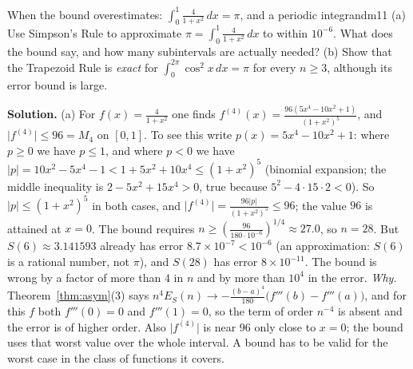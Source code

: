\documentclass[11pt]{article}
\begin{document}
\begin{exmp}{When the bound overestimates: $\int_0^1\frac4{1+x^2}\,dx=\pi$, and a periodic integrand}{m11}
(a) Use Simpson's Rule to approximate $\pi=\int_0^1\frac4{1+x^2}\,dx$ to within $10^{-6}$. What does the bound say, and how many subintervals are actually needed? (b) Show that the Trapezoid Rule is \emph{exact} for $\int_0^{2\pi}\cos^2x\,dx=\pi$ for every $n\ge3$, although its error bound is large.

\textbf{Solution.} (a) For $f(x)=\frac4{1+x^2}$ one finds $f^{(4)}(x)=\frac{96\left(5x^4-10x^2+1\right)}{(1+x^2)^5}$, and $\lvert f^{(4)}\rvert\le96=M_4$ on $[0,1]$. To see this write $p(x)=5x^4-10x^2+1$: where $p\ge0$ we have $p\le1$, and where $p<0$ we have $\lvert p\rvert=10x^2-5x^4-1<1+5x^2+10x^4\le(1+x^2)^5$ (binomial expansion; the middle inequality is $2-5x^2+15x^4>0$, true because $5^2-4\cdot15\cdot2<0$). So $\lvert p\rvert\le(1+x^2)^5$ in both cases, and $\lvert f^{(4)}\rvert=\frac{96\lvert p\rvert}{(1+x^2)^5}\le96$; the value $96$ is attained at $x=0$. The bound requires $n\ge\left(\frac{96}{180\cdot10^{-6}}\right)^{1/4}\approx27.0$, so $n=28$. But $S(6)\approx3.141593$ already has error $8.7\times10^{-7}<10^{-6}$ (an approximation: $S(6)$ is a rational number, not $\pi$), and $S(28)$ has error $8\times10^{-11}$. The bound is wrong by a factor of more than $4$ in $n$ and by more than $10^4$ in the error.
\emph{Why.} Theorem~\ref{thm:asym}(3) says $n^4E_S(n)\to-\frac{(b-a)^4}{180}\big(f'''(b)-f'''(a)\big)$, and for this $f$ both $f'''(0)=0$ and $f'''(1)=0$, so the term of order $n^{-4}$ is absent and the error is of higher order. Also $\lvert f^{(4)}\rvert$ is near $96$ only close to $x=0$; the bound uses that worst value over the whole interval. A bound has to be valid for the worst case in the class of functions it covers.


\end{exmp}
\end{document}
